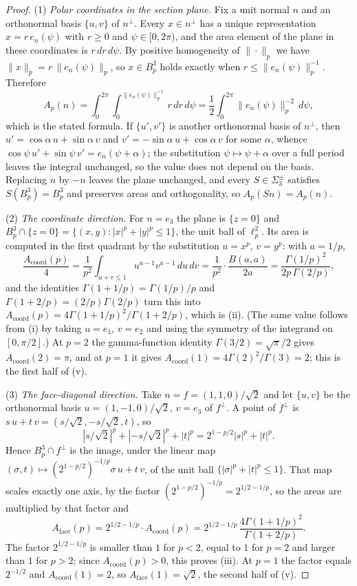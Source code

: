 \documentclass[11pt]{article}
\theoremstyle{plain}
\numberwithin{theorem}{section}
\begin{document}
\begin{proof}
(1) \emph{Polar coordinates in the section plane.} Fix a unit normal $n$ and an orthonormal basis $\{u,v\}$ of $n^{\perp}$. Every $x\in n^{\perp}$ has a unique representation $x=r\,e_n(\psi)$ with $r\ge0$ and $\psi\in[0,2\pi)$, and the area element of the plane in these coordinates is $r\,dr\,d\psi$. By positive homogeneity of $\|\cdot\|_p$ we have $\|x\|_p=r\,\|e_n(\psi)\|_p$, so $x\in B_p^3$ holds exactly when $r\le\|e_n(\psi)\|_p^{-1}$. Therefore
\[
A_p(n)=\int_0^{2\pi}\int_0^{\|e_n(\psi)\|_p^{-1}}r\,dr\,d\psi=\frac12\int_0^{2\pi}\big\|e_n(\psi)\big\|_p^{-2}\,d\psi,
\]
which is the stated formula. If $\{u',v'\}$ is another orthonormal basis of $n^{\perp}$, then $u'=\cos\alpha\,u+\sin\alpha\,v$ and $v'=-\sin\alpha\,u+\cos\alpha\,v$ for some $\alpha$, whence $\cos\psi\,u'+\sin\psi\,v'=e_n(\psi+\alpha)$; the substitution $\psi\mapsto\psi+\alpha$ over a full period leaves the integral unchanged, so the value does not depend on the basis. Replacing $n$ by $-n$ leaves the plane unchanged, and every $S\in\Sigma_3^{\pm}$ satisfies $S(B_p^3)=B_p^3$ and preserves areas and orthogonality, so $A_p(Sn)=A_p(n)$.

(2) \emph{The coordinate direction.} For $n=e_3$ the plane is $\{z=0\}$ and $B_p^3\cap\{z=0\}=\{(x,y):|x|^p+|y|^p\le1\}$, the unit ball of $\ell_p^2$. Its area is computed in the first quadrant by the substitution $u=x^p$, $v=y^p$: with $a=1/p$,
\[
\frac{A_{\mathrm{coord}}(p)}{4}=\frac1{p^2}\int_{u+v\le1}u^{a-1}v^{a-1}\,du\,dv=\frac1{p^2}\cdot\frac{B(a,a)}{2a}=\frac{\Gamma(1/p)^2}{2p\,\Gamma(2/p)},
\]
and the identities $\Gamma(1+1/p)=\Gamma(1/p)/p$ and $\Gamma(1+2/p)=(2/p)\Gamma(2/p)$ turn this into $A_{\mathrm{coord}}(p)=4\Gamma(1+1/p)^2/\Gamma(1+2/p)$, which is (ii). (The same value follows from (i) by taking $u=e_1$, $v=e_2$ and using the symmetry of the integrand on $[0,\pi/2]$.) At $p=2$ the gamma-function identity $\Gamma(3/2)=\sqrt\pi/2$ gives $A_{\mathrm{coord}}(2)=\pi$, and at $p=1$ it gives $A_{\mathrm{coord}}(1)=4\Gamma(2)^2/\Gamma(3)=2$; this is the first half of (v).

(3) \emph{The face-diagonal direction.} Take $n=f=(1,1,0)/\sqrt2$ and let $\{u,v\}$ be the orthonormal basis $u=(1,-1,0)/\sqrt2$, $v=e_3$ of $f^{\perp}$. A point of $f^{\perp}$ is $s\,u+t\,v=(s/\sqrt2,-s/\sqrt2,t)$, so
\[
|s/\sqrt2|^p+|{-s/\sqrt2}|^p+|t|^p=2^{1-p/2}|s|^p+|t|^p.
\]
Hence $B_p^3\cap f^{\perp}$ is the image, under the linear map $(\sigma,t)\mapsto(2^{1-p/2})^{-1/p}\sigma\,u+t\,v$, of the unit ball $\{|\sigma|^p+|t|^p\le1\}$. That map scales exactly one axis, by the factor $(2^{1-p/2})^{-1/p}=2^{1/2-1/p}$, so the areas are multiplied by that factor and
\[
A_{\mathrm{face}}(p)=2^{1/2-1/p}\cdot A_{\mathrm{coord}}(p)=2^{1/2-1/p}\,\frac{4\Gamma(1+1/p)^2}{\Gamma(1+2/p)}.
\]
The factor $2^{1/2-1/p}$ is smaller than $1$ for $p<2$, equal to $1$ for $p=2$ and larger than $1$ for $p>2$; since $A_{\mathrm{coord}}(p)>0$, this proves (iii). At $p=1$ the factor equals $2^{-1/2}$ and $A_{\mathrm{coord}}(1)=2$, so $A_{\mathrm{face}}(1)=\sqrt2$, the second half of (v).


\end{proof}
\end{document}

